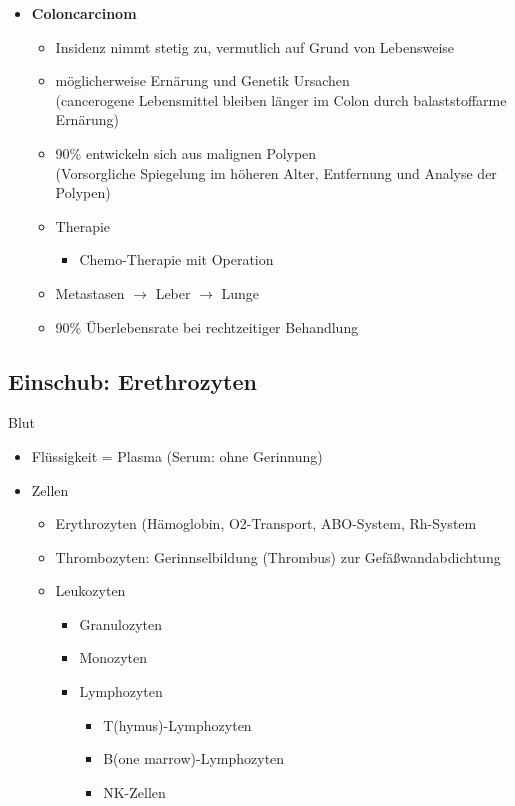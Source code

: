 \begin{itemize}
			\item \textbf{Coloncarcinom}
				\begin{itemize}
					\item Insidenz nimmt stetig zu, vermutlich auf Grund von Lebensweise
					\item möglicherweise Ernärung und Genetik Ursachen\\
						(cancerogene Lebensmittel bleiben länger im Colon durch balaststoffarme Ernärung)
					\item 90\% entwickeln sich aus malignen Polypen\\
						(Vorsorgliche Spiegelung im höheren Alter, Entfernung und Analyse der Polypen)
					\item Therapie
						\begin{itemize}
							\item Chemo-Therapie mit Operation
						\end{itemize}
					\item Metastasen $\rightarrow$ Leber $\rightarrow$ Lunge 
					\item 90\% Überlebensrate bei rechtzeitiger Behandlung
				\end{itemize}
				
		\end{itemize}
		\subsection{Einschub: Erethrozyten}
		Blut
			\begin{itemize}
				\item Flüssigkeit = Plasma (Serum: ohne Gerinnung)
				\item Zellen
					\begin{itemize}
						\item Erythrozyten (Hämoglobin, O2-Transport, ABO-System, Rh-System
						\item Thrombozyten: Gerinnselbildung (Thrombus) zur Gefäßwandabdichtung
						\item Leukozyten
							\begin{itemize}
								\item Granulozyten
								\item Monozyten	
								\item Lymphozyten
									\begin{itemize}
										\item T(hymus)-Lymphozyten
										\item B(one marrow)-Lymphozyten
										\item NK-Zellen
									\end{itemize}
							\end{itemize}
								
					\end{itemize}
			\end{itemize}